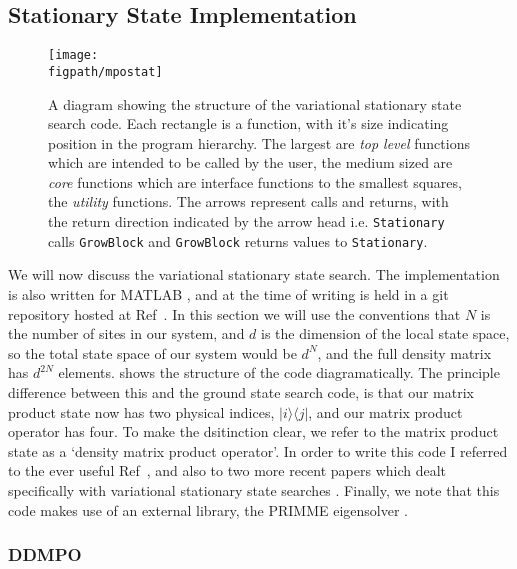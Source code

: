 \FloatBarrier 
 
 \subsection{Stationary State Implementation}
 
 \begin{figure}[ht!]
 \centering
 \texttt{[image: \\figpath/mpostat]}
 \caption{A diagram showing the structure of the variational stationary state search code. Each rectangle is a function, with it's size indicating position in the program hierarchy. The largest are \emph{top level} functions which are intended to be called by the user, the medium sized are \emph{core} functions which are interface functions to the smallest squares, the \emph{utility} functions. The arrows represent calls and returns, with the return direction indicated by the arrow head i.e. \lstinline$Stationary$ calls \lstinline$GrowBlock$ and \lstinline$GrowBlock$ returns values to \lstinline$Stationary$. }
 \label{fig:vs2-2}
 \end{figure} 
 
 We will now discuss the variational stationary state search. The implementation is also written for MATLAB \cite{MATLAB}, and at the time of writing is held in a git repository hosted at Ref~\cite{otb:gitVSSS}. In this section we will use the conventions that \(N\) is the number of sites in our system, and \(d\) is the dimension of the local state space, so the total state space of our system would be \(d^{N}\), and the full density matrix has \(d^{2N}\) elements.  shows the structure of the code diagramatically. The principle difference between this and the ground state search code, is that our matrix product state now has two physical indices, \(|i \rangle \langle j |\), and our matrix product operator has four. To make the dsitinction clear, we refer to the matrix product state as a `density matrix product operator'. In order to write this code I referred to the ever useful Ref~\cite{Schollwoeck11}, and also to two more recent papers which dealt specifically with variational stationary state searches \cite{CCB15,MFS15}. Finally, we note that this code makes use of an external library, the PRIMME eigensolver \cite{SM10,WRS16}.
 
 \subsubsection{DDMPO}
